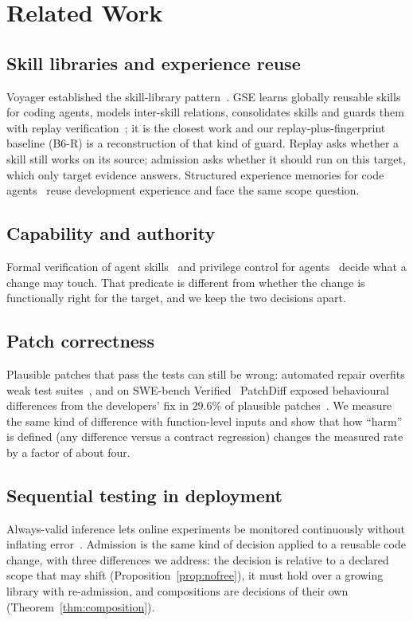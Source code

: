 \section{Related Work}
\label{sec:related}
\subsection{Skill libraries and experience reuse}
Voyager established the skill-library pattern~\cite{wang2024voyager}.  GSE learns globally reusable skills for coding agents, models
inter-skill relations, consolidates skills and guards them with replay verification~\cite{yang2026gse}; it is the closest work and
our replay-plus-fingerprint baseline (B6-R) is a reconstruction of that kind of guard.  Replay asks whether a skill still works on its
source; admission asks whether it should run on this target, which only target evidence answers.  Structured experience memories for
code agents~\cite{deng2026memcoder,wang2026memgovern} reuse development experience and face the same scope question.
\subsection{Capability and authority}
Formal verification of agent skills~\cite{metere2026formal} and privilege control for agents~\cite{debenedetti2025camel,shi2025progent}
decide what a change may touch.  That predicate is different from whether the change is functionally right for the target, and we keep
the two decisions apart.
\subsection{Patch correctness}
Plausible patches that pass the tests can still be wrong: automated repair overfits weak test suites~\cite{smith2015overfitting}, and on
SWE-bench Verified~\cite{jimenez2024swebench} PatchDiff exposed behavioural differences from the developers' fix in $29.6\%$ of plausible
patches~\cite{wang2026patchdiff}.  We measure the same kind of difference with function-level inputs and show that how ``harm'' is defined
(any difference versus a contract regression) changes the measured rate by a factor of about four.
\subsection{Sequential testing in deployment}
Always-valid inference lets online experiments be monitored continuously without inflating error~\cite{johari2022always}.  Admission is
the same kind of decision applied to a reusable code change, with three differences we address: the decision is relative to a declared
scope that may shift (Proposition~\ref{prop:nofree}), it must hold over a growing library with re-admission, and compositions are
decisions of their own (Theorem~\ref{thm:composition}).

